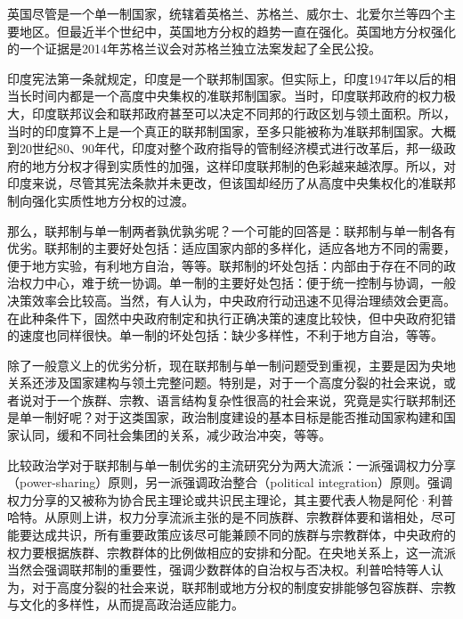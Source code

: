 英国尽管是一个单一制国家，统辖着英格兰、苏格兰、威尔士、北爱尔兰等四个主要地区。但最近半个世纪中，英国地方分权的趋势一直在强化。英国地方分权强化的一个证据是2014年苏格兰议会对苏格兰独立法案发起了全民公投。

印度宪法第一条就规定，印度是一个联邦制国家。但实际上，印度1947年以后的相当长时间内都是一个高度中央集权的准联邦制国家。当时，印度联邦政府的权力极大，印度联邦议会和联邦政府甚至可以决定不同邦的行政区划与领土面积。所以，当时的印度算不上是一个真正的联邦制国家，至多只能被称为准联邦制国家。大概到20世纪80、90年代，印度对整个政府指导的管制经济模式进行改革后，邦一级政府的地方分权才得到实质性的加强，这样印度联邦制的色彩越来越浓厚。所以，对印度来说，尽管其宪法条款并未更改，但该国却经历了从高度中央集权化的准联邦制向强化实质性地方分权的过渡。

那么，联邦制与单一制两者孰优孰劣呢？一个可能的回答是：联邦制与单一制各有优劣。联邦制的主要好处包括：适应国家内部的多样化，适应各地方不同的需要，便于地方实验，有利地方自治，等等。联邦制的坏处包括：内部由于存在不同的政治权力中心，难于统一协调。单一制的主要好处包括：便于统一控制与协调，一般决策效率会比较高。当然，有人认为，中央政府行动迅速不见得治理绩效会更高。在此种条件下，固然中央政府制定和执行正确决策的速度比较快，但中央政府犯错的速度也同样很快。单一制的坏处包括：缺少多样性，不利于地方自治，等等。

除了一般意义上的优劣分析，现在联邦制与单一制问题受到重视，主要是因为央地关系还涉及国家建构与领土完整问题。特别是，对于一个高度分裂的社会来说，或者说对于一个族群、宗教、语言结构复杂性很高的社会来说，究竟是实行联邦制还是单一制好呢？对于这类国家，政治制度建设的基本目标是能否推动国家构建和国家认同，缓和不同社会集团的关系，减少政治冲突，等等。

比较政治学对于联邦制与单一制优劣的主流研究分为两大流派：一派强调权力分享（power-sharing）原则，另一派强调政治整合（political integration）原则。强调权力分享的又被称为协合民主理论或共识民主理论，其主要代表人物是阿伦·利普哈特。从原则上讲，权力分享流派主张的是不同族群、宗教群体要和谐相处，尽可能要达成共识，所有重要政策应该尽可能兼顾不同的族群与宗教群体，中央政府的权力要根据族群、宗教群体的比例做相应的安排和分配。在央地关系上，这一流派当然会强调联邦制的重要性，强调少数群体的自治权与否决权。利普哈特等人认为，对于高度分裂的社会来说，联邦制或地方分权的制度安排能够包容族群、宗教与文化的多样性，从而提高政治适应能力。


